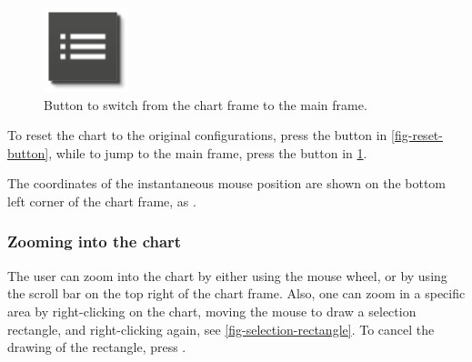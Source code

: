 \documentclass{ol-softwaremanual}
\makeatletter
\def\setmenukeyswin{\def\tw@mk@os{win}}
\makeatother
\begin{document}
\begin{figure}
  \includegraphics[width=\linewidth]{figures/list-frame-button.png}
  \caption{\label{fig-list-frame-button} Button to switch from the chart frame to the main frame.}
  \end{figure}
  \noindent

  
  

To reset the chart to the original configurations, press the button in \cref{fig-reset-button}, while to jump to the main frame, press the button in \cref{fig-list-frame-button}. 



The coordinates of the instantaneous mouse \gls{position} are shown on the bottom left corner of the chart frame, as . 




\subsubsection{Zooming into the chart} The user can zoom into the chart by either using the mouse wheel, or by using the scroll bar on the top right of the chart frame. Also, one can zoom in a specific area by right-clicking on the chart, moving the mouse to draw a selection rectangle, and right-clicking again, see \cref{fig-selection-rectangle}. To cancel the drawing of the rectangle, press \setmenukeyswin \keys{\esc}. 
\end{document}
